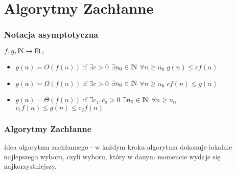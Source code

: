 \section{Algorytmy Zachłanne}
\subsubsection{Notacja asymptotyczna}
\(f,g,{\rm I\!N} \rightarrow {\rm I\!R}_+\)
\begin{itemize}
	\item \( g(n) = O(f(n))\) if \(\exists{c}>0\) \(\exists{n_0}\in {\rm I\!N} \) \(\forall{n} \geq n_0\) \(g(n) \leq c f(n)\)
    \item \( g(n) = \Omega(f(n))\) if \(\exists{c}>0\) \(\exists{n_0}\in {\rm I\!N} \) \(\forall{n} \geq n_0\) \(cf(n) \leq g(n)\)
    \item \( g(n) = \Theta(f(n))\) if \(\exists{c_1,c_2}>0\) \(\exists{n_0}\in {\rm I\!N} \) \(\forall{n} \geq n_0\) \(c_1 f(n)\leq g(n) \leq c_2 f(n)\)
\end{itemize}
\subsubsection{Algorytmy Zachłanne}
Idea algorytmu zachłannego - w każdym kroku algorytmu dokonuje lokalnie najlepszego wyboru, czyli wyboru, który w danym momencie wydaje się najkorzystniejszy.